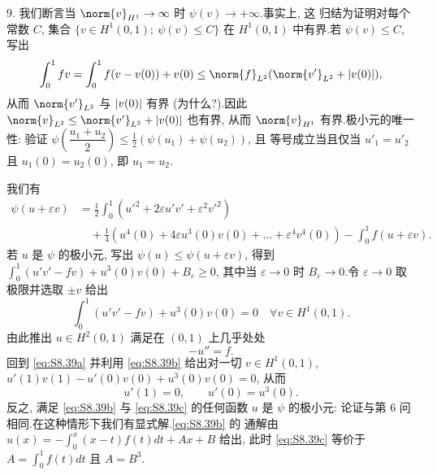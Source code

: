 9. 我们断言当 $\norm{v}_{H^1}\to\infty$ 时 $\psi(v)\to+\infty$.事实上, 这
归结为证明对每个常数 $C$, 集合 $\{v\in H^1(0,1);\ \psi(v)\le C\}$ 在
$H^1(0,1)$ 中有界.若 $\psi(v)\le C$, 写出
\begin{equation*}
\int_0^1fv=\int_0^1f(v-v(0))+v(0)\le\norm{f}_{L^2}(\norm{v'}_{L^2}+\abs{v(0)}),
\end{equation*}
从而 $\norm{v'}_{L^2}$ 与 $\left|v(0)\right|$ 有界 (为什么?).因此
$\norm{v}_{L^2}\le\norm{v'}_{L^2}+\abs{v(0)}$ 也有界, 从而 $\norm{v}_{H^1}$
有界.极小元的唯一性: 验证
$\psi\left(\dfrac{u_1+u_2}{2}\right)\le\frac12(\psi(u_1)+\psi(u_2))$, 且
等号成立当且仅当 $u'_1=u'_2$ 且 $u_1(0)=u_2(0)$, 即 $u_1=u_2$.

我们有
\begin{align*}
\psi(u+\varepsilon v)&=\frac12\int_0^1(u'^2+2\varepsilon u'v'+\varepsilon^2v'^2)\\
&\quad+\frac14(u^4(0)+4\varepsilon u^3(0)v(0)+\dots+\varepsilon^4v^4(0))-\int_0^1f(u+\varepsilon v).
\end{align*}
若 $u$ 是 $\psi$ 的极小元, 写出 $\psi(u)\le\psi(u+\varepsilon v)$, 得到
$\int_0^1(u'v'-fv)+u^3(0)v(0)+B_\varepsilon\ge0$, 其中当 $\varepsilon\to0$ 时
$B_\varepsilon\to0$.令 $\varepsilon\to0$ 取极限并选取 $\pm v$ 给出
\begin{equation}
\int_0^1(u'v'-fv)+u^3(0)v(0)=0\quad\forall v\in H^1(0,1).
\tag{S1}
\label{eq:S8.39a}
\end{equation}
由此推出 $u\in H^2(0,1)$ 满足在 $(0,1)$ 上几乎处处
\begin{equation}
-u''=f.
\tag{S2}
\label{eq:S8.39b}
\end{equation}
回到 \eqref{eq:S8.39a} 并利用 \eqref{eq:S8.39b} 给出对一切 $v\in H^1(0,1)$,
$u'(1)v(1)-u'(0)v(0)+u^3(0)v(0)=0$, 从而
\begin{equation}
u'(1)=0,\qquad u'(0)=u^3(0).
\tag{S3}
\label{eq:S8.39c}
\end{equation}
反之, 满足 \eqref{eq:S8.39b} 与 \eqref{eq:S8.39c} 的任何函数 $u$ 是 $\psi$
的极小元: 论证与第 6 问相同.在这种情形下我们有显式解.\eqref{eq:S8.39b} 的
通解由 $u(x)=-\int_0^x(x-t)f(t)dt+Ax+B$ 给出, 此时 \eqref{eq:S8.39c} 等价于
$A=\int_0^1f(t)dt$ 且 $A=B^3$.


